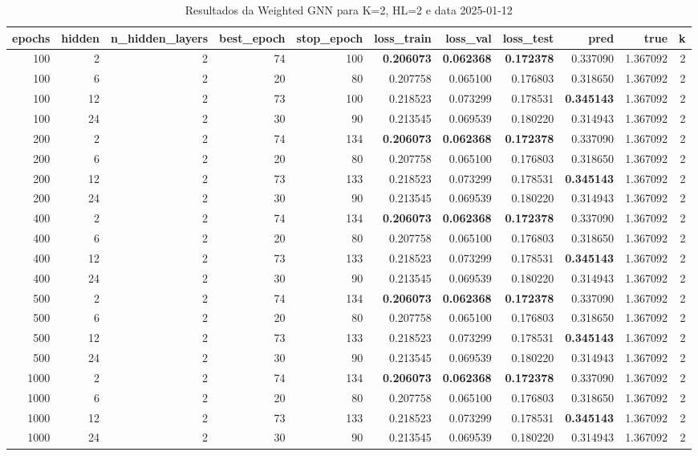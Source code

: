 \begin{table}
\caption{Resultados da Weighted GNN para K=2, HL=2 e data 2025-01-12}
\label{tab:weighted_gnn_results_k2_hl2_d20250112}
\begin{tabular}{rrrrrrrrrrr}
\toprule
epochs & hidden & n\_hidden\_layers & best\_epoch & stop\_epoch & loss\_train & loss\_val & loss\_test & pred & true & k \\
\midrule
100 & 2 & 2 & 74 & 100 & \textbf{0.206073} & \textbf{0.062368} & \textbf{0.172378} & 0.337090 & 1.367092 & 2 \\
100 & 6 & 2 & 20 & 80 & 0.207758 & 0.065100 & 0.176803 & 0.318650 & 1.367092 & 2 \\
100 & 12 & 2 & 73 & 100 & 0.218523 & 0.073299 & 0.178531 & \textbf{0.345143} & 1.367092 & 2 \\
100 & 24 & 2 & 30 & 90 & 0.213545 & 0.069539 & 0.180220 & 0.314943 & 1.367092 & 2 \\
200 & 2 & 2 & 74 & 134 & \textbf{0.206073} & \textbf{0.062368} & \textbf{0.172378} & 0.337090 & 1.367092 & 2 \\
200 & 6 & 2 & 20 & 80 & 0.207758 & 0.065100 & 0.176803 & 0.318650 & 1.367092 & 2 \\
200 & 12 & 2 & 73 & 133 & 0.218523 & 0.073299 & 0.178531 & \textbf{0.345143} & 1.367092 & 2 \\
200 & 24 & 2 & 30 & 90 & 0.213545 & 0.069539 & 0.180220 & 0.314943 & 1.367092 & 2 \\
400 & 2 & 2 & 74 & 134 & \textbf{0.206073} & \textbf{0.062368} & \textbf{0.172378} & 0.337090 & 1.367092 & 2 \\
400 & 6 & 2 & 20 & 80 & 0.207758 & 0.065100 & 0.176803 & 0.318650 & 1.367092 & 2 \\
400 & 12 & 2 & 73 & 133 & 0.218523 & 0.073299 & 0.178531 & \textbf{0.345143} & 1.367092 & 2 \\
400 & 24 & 2 & 30 & 90 & 0.213545 & 0.069539 & 0.180220 & 0.314943 & 1.367092 & 2 \\
500 & 2 & 2 & 74 & 134 & \textbf{0.206073} & \textbf{0.062368} & \textbf{0.172378} & 0.337090 & 1.367092 & 2 \\
500 & 6 & 2 & 20 & 80 & 0.207758 & 0.065100 & 0.176803 & 0.318650 & 1.367092 & 2 \\
500 & 12 & 2 & 73 & 133 & 0.218523 & 0.073299 & 0.178531 & \textbf{0.345143} & 1.367092 & 2 \\
500 & 24 & 2 & 30 & 90 & 0.213545 & 0.069539 & 0.180220 & 0.314943 & 1.367092 & 2 \\
1000 & 2 & 2 & 74 & 134 & \textbf{0.206073} & \textbf{0.062368} & \textbf{0.172378} & 0.337090 & 1.367092 & 2 \\
1000 & 6 & 2 & 20 & 80 & 0.207758 & 0.065100 & 0.176803 & 0.318650 & 1.367092 & 2 \\
1000 & 12 & 2 & 73 & 133 & 0.218523 & 0.073299 & 0.178531 & \textbf{0.345143} & 1.367092 & 2 \\
1000 & 24 & 2 & 30 & 90 & 0.213545 & 0.069539 & 0.180220 & 0.314943 & 1.367092 & 2 \\
\bottomrule
\end{tabular}
\end{table}


